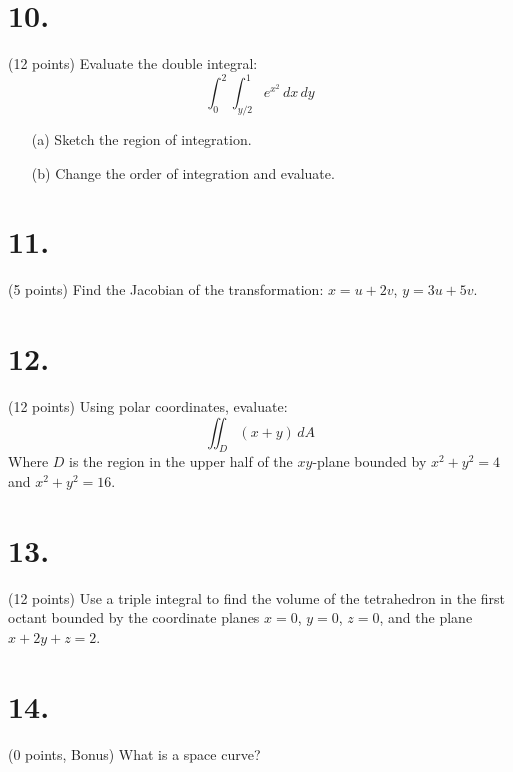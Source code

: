 \newpage

\section*{10.}
(12 points) Evaluate the double integral:
\[
\int_0^2 \int_{y/2}^1 e^{x^2} \, dx\, dy
\]
\begin{itemize}
    \item[(a)] Sketch the region of integration.
    \item[(b)] Change the order of integration and evaluate.
\end{itemize}

\newpage

\section*{11.}\text
(5 points) Find the Jacobian of the transformation: $x = u + 2v$, $y = 3u + 5v$.

\section*{12.}
(12 points) Using polar coordinates, evaluate:
\[
\iint_D (x + y) \, dA
\]
Where $D$ is the region in the upper half of the $xy$-plane bounded by $x^2 + y^2 = 4$ and $x^2 + y^2 = 16$.

\newpage

\section*{13.}
(12 points) Use a triple integral to find the volume of the tetrahedron in the first octant bounded by the coordinate planes $x = 0$, $y = 0$, $z = 0$, and the plane $x + 2y + z = 2$.

\section*{14.}
(0 points, Bonus) What is a space curve?

